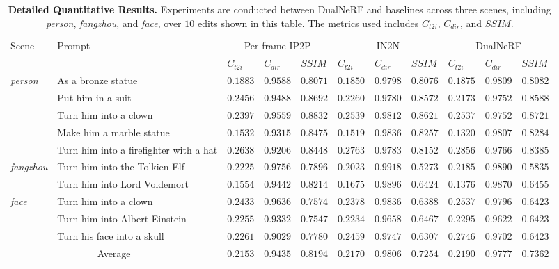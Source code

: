 \begin{table*}[htbp]
    \centering
    \begin{tabular}{p{32pt}<{\centering}|p{145pt}<{\centering}|p{25pt}<{\centering}|p{25pt}<{\centering}|p{25pt}<{\centering}|p{25pt}<{\centering}|p{25pt}<{\centering}|p{25pt}<{\centering}|p{25pt}<{\centering}|p{25pt}<{\centering}|p{25pt}<{\centering}}
    \toprule
    \multirow{2}{*}{Scene} & \multirow{2}{*}{Prompt} & \multicolumn{3}{c|}{Per-frame IP2P} & \multicolumn{3}{c|}{IN2N} & \multicolumn{3}{c}{DualNeRF} \\
    \cline{3-11}
     &  & $C_{t2i}$ & $C_{dir}$ & $SSIM$ & $C_{t2i}$ & $C_{dir}$ & $SSIM$ & $C_{t2i}$ & $C_{dir}$ & $SSIM$ \\
    \midrule
    \multirow{5}{*}{\textit{person}} & As a bronze statue & $0.1883$ & $0.9588$ & $0.8071$ & $0.1850$ & $0.9798$ & $0.8076$ & $0.1875$ & $0.9809$ & $0.8082$ \\
     & Put him in a suit & $0.2456$ & $0.9488$ & $0.8692$ & $0.2260$ & $0.9780$ & $0.8572$ & $0.2173$ & $0.9752$ & $0.8588$ \\
     & Turn him into a clown & $0.2397$ & $0.9559$ & $0.8832$ & $0.2539$ & $0.9812$ & $0.8621$ & $0.2537$ & $0.9752$ & $0.8721$ \\
     & Make him a marble statue & $0.1532$ & $0.9315$ & $0.8475$ & $0.1519$ & $0.9836$ & $0.8257$ & $0.1320$ & $0.9807$ & $0.8284$ \\
     & Turn him into a firefighter with a hat
     & $0.2638$ & $0.9206$ & $0.8448$ & $0.2763$ & $0.9783$ & $0.8152$ & $0.2856$ & $0.9766$ & $0.8385$ \\
    \hline
    \multirow{2}{*}{\textit{fangzhou}} & Turn him into the Tolkien Elf
 & $0.2225$ & $0.9756$ & $0.7896$ & $0.2023$ & $0.9918$ & $0.5273$ & $0.2185$ & $0.9890$ & $0.5835$ \\
     & Turn him into Lord Voldemort
 & $0.1554$ & $0.9442$ & $0.8214$ & $0.1675$ & $0.9896$ & $0.6424$ & $0.1376$ & $0.9870$ & $0.6455$ \\
    \hline
    \multirow{3}{*}{\textit{face}} & Turn him into a clown
 & $0.2433$ & $0.9636$ & $0.7574$ & $0.2378$ & $0.9836$ & $0.6388$ & $0.2537$ & $0.9796$ & $0.6423$ \\
     & Turn him into Albert Einstein
 & $0.2255$ & $0.9332$ & $0.7547$ & $0.2234$ & $0.9658$ & $0.6467$ & $0.2295$ & $0.9622$ & $0.6423$ \\
     & Turn his face into a skull
 & $0.2261$ & $0.9029$ & $0.7780$ & $0.2459$ & $0.9747$ & $0.6307$ & $0.2746$ & $0.9702$ & $0.6423$ \\
    \hline
    \multicolumn{2}{c|}{Average} & $0.2153$ & $0.9435$ & $\boldsymbol{0.8194}$ & $0.2170$ & $\boldsymbol{0.9806}$ & $0.7254$ & $\boldsymbol{0.2190}$ & $0.9777$ & $0.7362$ \\
    \bottomrule
    \end{tabular}
    \caption{\textbf{Detailed Quantitative Results.} Experiments are conducted between DualNeRF and baselines across three scenes, including \textit{person}, \textit{fangzhou}, and \textit{face}, over $10$ edits shown in this table. The metrics used includes $C_{t2i}$, $C_{dir}$, and $SSIM$.}
    \label{tab: detailed results}
\end{table*}

